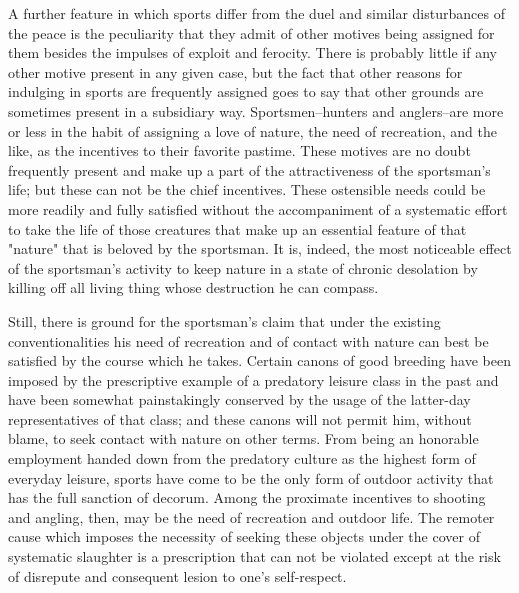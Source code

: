 \documentclass[12pt]{report}
\begin{document}
A further feature in which sports differ from the duel and similar
disturbances of the peace is the peculiarity that they admit of other
motives being assigned for them besides the impulses of exploit and
ferocity. There is probably little if any other motive present in any
given case, but the fact that other reasons for indulging in sports are
frequently assigned goes to say that other grounds are sometimes present
in a subsidiary way. Sportsmen--hunters and anglers--are more or less in
the habit of assigning a love of nature, the need of recreation, and the
like, as the incentives to their favorite pastime. These motives are no
doubt frequently present and make up a part of the attractiveness of
the sportsman's life; but these can not be the chief incentives. These
ostensible needs could be more readily and fully satisfied without the
accompaniment of a systematic effort to take the life of those creatures
that make up an essential feature of that "nature" that is beloved
by the sportsman. It is, indeed, the most noticeable effect of the
sportsman's activity to keep nature in a state of chronic desolation by
killing off all living thing whose destruction he can compass.

Still, there is ground for the sportsman's claim that under the existing
conventionalities his need of recreation and of contact with nature can
best be satisfied by the course which he takes. Certain canons of good
breeding have been imposed by the prescriptive example of a predatory
leisure class in the past and have been somewhat painstakingly conserved
by the usage of the latter-day representatives of that class; and these
canons will not permit him, without blame, to seek contact with nature
on other terms. From being an honorable employment handed down from the
predatory culture as the highest form of everyday leisure, sports have
come to be the only form of outdoor activity that has the full sanction
of decorum. Among the proximate incentives to shooting and angling,
then, may be the need of recreation and outdoor life. The remoter cause
which imposes the necessity of seeking these objects under the cover of
systematic slaughter is a prescription that can not be violated except
at the risk of disrepute and consequent lesion to one's self-respect.
\end{document}
